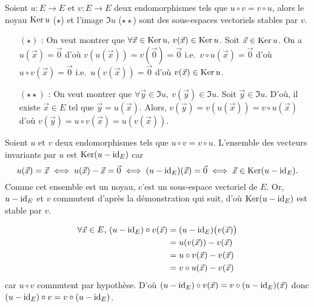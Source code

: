 \begin{prop}
	Soient $u : E \to E$\/ et $v : E \to E$\/ deux endomorphismes tels que $u \circ v = v  \circ u$, alors le noyau $\operatorname{Ker} u$\/ ($\star$) et l'image $\Im u$\/ ($\star\star$) sont des sous-espaces vectoriels stables par $v$.
\end{prop}

\begin{prv}
	\begin{itemize}
		\item[$(\star)$ :]
			On veut montrer que $\forall \vec{x} \in \operatorname{Ker} u,\,v(\vec{x}) \in \operatorname{Ker} u$. Soit $\vec{x} \in \operatorname{Ker} u$.
			On a $u(\vec{x}) = \vec{0}$\/ d'où $v(u(\vec{x})) = v(\vec{0}) = \vec{0}$\/ i.e.\ $v  \circ u (\vec{x}) = \vec{0}$\/ d'où $u  \circ v (\vec{x}) = \vec{0}$\/ i.e.\ $u(v(\vec{x})) = \vec{0}$\/ d'où $v(\vec{x}) \in \operatorname{Ker} u$.
		\item[$(\star\star)$ :]
			On veut montrer que $\forall \vec{y} \in \Im u,\:v(\vec{y}) \in \Im u$.
			Soit $\vec{y} \in \Im u$. D'où, il existe $\vec{x} \in E$\/ tel que $\vec{y} = u(\vec{x})$. Alors, $v(\vec{y}) = v(u(\vec{x})) = v  \circ u (\vec{x})$\/ d'où $v(\vec{y}) = u  \circ v(\vec{x}) = u(v(\vec{x}))$.
	\end{itemize}
\end{prv}

\begin{exo}
	Soient $u$\/ et $v$\/ deux endomorphismes tels que $u \circ v = v  \circ u$.
	L'ensemble des vecteurs invariants par $u$\/ est $\operatorname{Ker}(u - \operatorname{id}_E)$\/ car \[
		u(\vec{x}) = \vec{x} \iff u(\vec{x}) - \vec{x} = \vec{0} \iff (u - \operatorname{id}_E)(\vec{x}) = \vec{0} \iff \vec{x} \in \operatorname{Ker}(u - \operatorname{id}_E)
	.\] Comme cet ensemble est un noyau, c'est un sous-espace vectoriel de $E$.
	Or, $u-\operatorname{id}_E$\/ et $v$\/ commutent d'après la démonstration qui suit, d'où $\operatorname{Ker}(u- \operatorname{id}_E)$\/ est stable par $v$.

	\begin{align*}
		\forall \vec{x} \in E,\,(u-\operatorname{id}_E)  \circ v (\vec{x}) &= (u-\operatorname{id}_E)\big(v(\vec{x})\big) \\
		&= u(v(\vec{x})) - v(\vec{x}) \\
		&= u  \circ v(\vec{x}) - v(\vec{x}) \\
		&= v  \circ u(\vec{x}) - v(\vec{x}) \\
	\end{align*}
	car $u  \circ v$\/ commutent par hypothèse.
	D'où $(u - \operatorname{id}_E)  \circ v(\vec{x}) = v  \circ (u - \operatorname{id}_E)(\vec{x})$\/ donc $(u-\operatorname{id}_E) \circ v = v  \circ (u - \operatorname{id}_E)$.
\end{exo}

